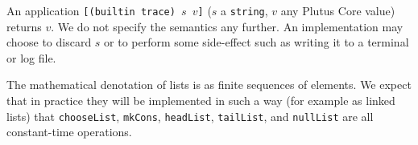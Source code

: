 \label{note:trace}
An application \texttt{[(builtin trace) $s$ $v$]} ($s$ a \texttt{string}, $v$
any Plutus Core value) returns $v$.  We do not specify the semantics any
further.  An implementation may choose to discard $s$ or to perform some
side-effect such as writing it to a terminal or log file.

\label{note:list-semantics}
The mathematical denotation of lists is as finite sequences of elements.  We
expect that in practice they will be implemented in such a way (for example as
linked lists)
that \texttt{chooseList}, \texttt{mkCons}, \texttt{headList}, \texttt{tailList},
and \texttt{nullList} are all constant-time operations.
\newpage
